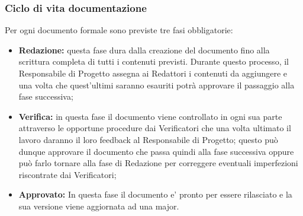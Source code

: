 		\subsubsection{Ciclo di vita documentazione}
			Per ogni documento formale sono previste tre fasi obbligatorie:
			\begin{itemize}
			\item \textbf{Redazione:} questa fase dura dalla creazione del documento fino alla scrittura completa di tutti i contenuti previsti. Durante questo processo, il Responsabile di Progetto assegna ai Redattori i contenuti da aggiungere e una volta che quest'ultimi saranno esauriti potrà approvare il passaggio alla fase successiva;
			\item \textbf{Verifica:} in questa fase il documento viene controllato in ogni sua parte attraverso le opportune procedure dai Verificatori che una volta ultimato il lavoro daranno il loro feedback al Responsabile di Progetto; questo può dunque approvare il documento che passa quindi alla fase successiva oppure può farlo tornare alla fase di Redazione per correggere eventuali imperfezioni riscontrate dai Verificatori;
			\item \textbf{Approvato:} In questa fase il documento e' pronto per essere rilasciato e la sua versione viene aggiornata ad una major.
			\end{itemize}
